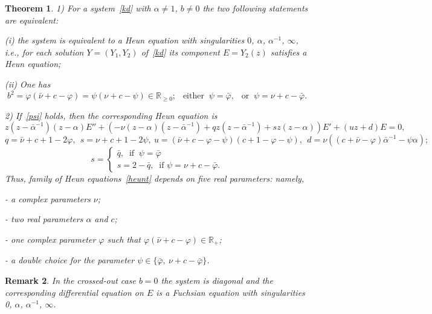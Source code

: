 \documentclass[preprint,12pt]{elsarticle}
\theoremstyle{plain}
\newtheorem{theorem}{Theorem}
\newtheorem{remark}[theorem]{Remark}
\renewcommand{\phi}{\varphi}
\def\a{\alpha}
\def\ba{\bar\alpha}
\def\bam{\ba^{-1}}
\numberwithin{equation}{section}
\numberwithin{equation}{section}
\begin{document}
\begin{theorem} \label{heuntor} 1) For a system~\eqref{kd} with $\alpha\neq1$, $b\neq0$ the two following statements are equivalent:

(i) the system is equivalent to a Heun equation with singularities $0$, $\alpha$, $\a^{-1}$, $\infty$, i.e., 
for each solution $Y=(Y_1,  Y_2)$ of~\eqref{kd} its component $E=Y_2(z)$  
satisfies a Heun equation;

(ii)  One has  
\begin{equation}b^2=\phi(\bar\nu+c-\phi)=\psi(\nu+c-\psi)\in\mathbb{R}_{\geq0}; \ \ \text{ either } \ \psi=\bar\phi, \ \ \text{ or } \ \psi=\nu+c-\bar\phi.\label{psi}\end{equation}

2) If~\eqref{psi} holds, then 
 the corresponding Heun equation is 
\begin{equation} z(z-\bam)(z-\a)E''+(-\nu(z-\alpha)(z-\bam)+q z(z-\bam)+sz(z-\a))E'+(uz+d)E=0,
\label{heunt}\end{equation}
$$q=\bar\nu+c+1-2\phi, \ \ s=\nu+c+1-2\psi, \ u=(\bar\nu+c-\phi-\psi)(c+1-\phi-\psi), \ \ d=\nu((c+\bar\nu-\phi)\bam-\psi\a);$$
$$s=\begin{cases} \bar q, \ \text{ if } \ \psi=\bar\phi\\
s=2-\bar q, \ \text{ if } \psi=\nu+c-\bar\phi.\end{cases}$$
Thus, family of Heun equations~\eqref{heunt} depends on five real parameters: namely, 

-  a complex parameters  $\nu$;

- two real parameters $\alpha$ and $c$; 

- one complex parameter $\phi$ such that $\phi(\bar\nu+c-\phi)\in\mathbb{R}_+$;

- a double  choice for the parameter $\psi\in\{\bar\phi, \ \nu+c-\bar\phi\}$.
\end{theorem}
\begin{remark} In the crossed-out case $b=0$ the system is diagonal and the corresponding differential equation on $E$ is a Fuchsian equation with singularities 0, $\alpha$, $\alpha^{-1}$, $\infty$.
\end{remark}
\end{document}
